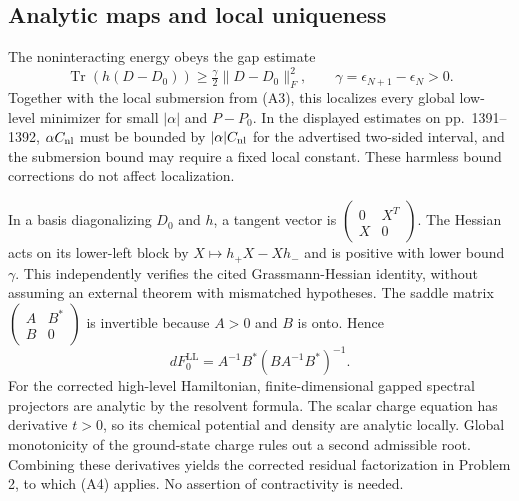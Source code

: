 \documentclass[10pt]{article}
\begin{document}
\subsection*{Analytic maps and local uniqueness}
The noninteracting energy obeys the gap estimate \[\operatorname{Tr}(h(D-D_0))\geq \tfrac{\gamma}{2}\|D-D_0\|_F^2,
 \qquad \gamma=\epsilon_{N+1}-\epsilon_N>0.\] Together with the local submersion from (A3), this localizes every global low-level minimizer for small \(|\alpha|\) and \(P-P_0\). In the displayed estimates on pp. 1391–1392, \(\alpha C_{\rm nl}\) must be bounded by \(|\alpha|C_{\rm nl}\) for the advertised two-sided interval, and the submersion bound may require a fixed local constant. These harmless bound corrections do not affect localization.\par
In a basis diagonalizing \(D_0\) and \(h\), a tangent vector is \(\left(\begin{smallmatrix}0&X^T\\X&0\end{smallmatrix}\right)\). The Hessian acts on its lower-left block by \(X\mapsto h_+X-Xh_-\) and is positive with lower bound \(\gamma\). This independently verifies the cited Grassmann-Hessian identity, without assuming an external theorem with mismatched hypotheses. The saddle matrix \(\left(\begin{smallmatrix}A&B^*\\B&0\end{smallmatrix}\right)\) is invertible because \(A>0\) and \(B\) is onto. Hence \[dF^\mathrm{LL}_0=A^{-1}B^*(BA^{-1}B^*)^{-1}.\] For the corrected high-level Hamiltonian, finite-dimensional gapped spectral projectors are analytic by the resolvent formula. The scalar charge equation has derivative \(t>0\), so its chemical potential and density are analytic locally. Global monotonicity of the ground-state charge rules out a second admissible root. Combining these derivatives yields the corrected residual factorization in Problem 2, to which (A4) applies. No assertion of contractivity is needed.\par
\end{document}
